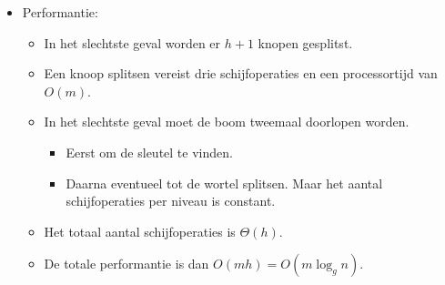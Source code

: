 \begin{itemize}
\begin{enumerate}
\begin{enumerate}
        \end{enumerate}
    \end{enumerate}
    \item Performantie:
    \begin{itemize}
        \item In het slechtste geval worden er $h + 1$ knopen gesplitst. 
        \item Een knoop splitsen vereist drie schijfoperaties en een processortijd van $O(m)$.
        \item In het slechtste geval moet de boom tweemaal doorlopen worden.
        \begin{itemize}
            \item Eerst om de sleutel te vinden.
            \item Daarna eventueel tot de wortel splitsen.
            \good Maar het aantal schijfoperaties per niveau is constant.
        \end{itemize}
        \item Het totaal aantal schijfoperaties is $\Theta(h)$.
        \item De totale performantie is dan $O(mh) = O(m \log_g n)$.
    \end{itemize}
   
\end{itemize}

